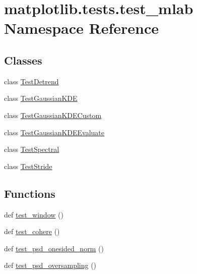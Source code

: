 \hypertarget{namespacematplotlib_1_1tests_1_1test__mlab}{}\section{matplotlib.\+tests.\+test\+\_\+mlab Namespace Reference}
\label{namespacematplotlib_1_1tests_1_1test__mlab}
\subsection*{Classes}
\begin{DoxyCompactItemize}
\item 
class \hyperlink{classmatplotlib_1_1tests_1_1test__mlab_1_1TestDetrend}{Test\+Detrend}
\item 
class \hyperlink{classmatplotlib_1_1tests_1_1test__mlab_1_1TestGaussianKDE}{Test\+Gaussian\+K\+DE}
\item 
class \hyperlink{classmatplotlib_1_1tests_1_1test__mlab_1_1TestGaussianKDECustom}{Test\+Gaussian\+K\+D\+E\+Custom}
\item 
class \hyperlink{classmatplotlib_1_1tests_1_1test__mlab_1_1TestGaussianKDEEvaluate}{Test\+Gaussian\+K\+D\+E\+Evaluate}
\item 
class \hyperlink{classmatplotlib_1_1tests_1_1test__mlab_1_1TestSpectral}{Test\+Spectral}
\item 
class \hyperlink{classmatplotlib_1_1tests_1_1test__mlab_1_1TestStride}{Test\+Stride}
\end{DoxyCompactItemize}
\subsection*{Functions}
\begin{DoxyCompactItemize}
\item 
def \hyperlink{namespacematplotlib_1_1tests_1_1test__mlab_af61e35ef247cd3468a13aad94592d6be}{test\+\_\+window} ()
\item 
def \hyperlink{namespacematplotlib_1_1tests_1_1test__mlab_adb48ae52778b3ef6395f62a685daba14}{test\+\_\+cohere} ()
\item 
def \hyperlink{namespacematplotlib_1_1tests_1_1test__mlab_a4b036cc62b11093235fb4d788d14c21c}{test\+\_\+psd\+\_\+onesided\+\_\+norm} ()
\item 
def \hyperlink{namespacematplotlib_1_1tests_1_1test__mlab_ae015d4491128895a62ec62ee2cdd1743}{test\+\_\+psd\+\_\+oversampling} ()
\end{DoxyCompactItemize}


